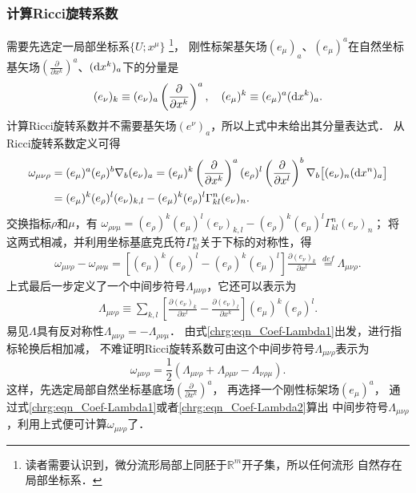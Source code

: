 \subsubsection{计算Ricci旋转系数}
     需要先选定一局部坐标系$\{U;x^\mu\}$
    {\footnote{读者需要认识到，微分流形局部上同胚于$\mathbb{R}^m$开子集，所以任何流形
            自然存在局部坐标系．}}，
刚性标架基矢场$(e_\mu)_{a}$、$(e_\mu)^{a}$在自然坐标
基矢场$(\frac{\partial}{\partial x^k})^{a}$、$({\rm d}x^k)_{a}$下的分量是
\begin{equation}\label{chrg:eqn_component-base}
(e_\nu)_{k} \equiv (e_\nu)_{a} \left(\frac{\partial}{\partial x^k}\right)^{a} , \quad
(e_\mu)^{k} \equiv (e_\mu)^{a} ({\rm d}x^k)_{a}.
\end{equation}
计算Ricci旋转系数并不需要基矢场$(e^\nu)_{a}$，所以上式中未给出其分量表达式．
从Ricci旋转系数定义可得
\begin{align*}
  \omega_{\mu\nu\rho} &= (e_\mu)^a  (e_\rho)^b \nabla _b (e_\nu)_a
  = (e_\mu)^{k} \left(\frac{\partial}{\partial x^k}\right)^{a}
   (e_\rho)^{l} \left(\frac{\partial}{\partial x^l}\right)^{b}
    \nabla _b \bigl[ (e_\nu)_{n}({\rm d}x^n)_{a} \bigr]  \\
  &=(e_\mu)^{k}(e_\rho)^{l} (e_\nu)_{k,l}
   -(e_\mu)^{k}(e_\rho)^{l}\Gamma^n _{kl}(e_\nu)_{n} .
\end{align*}
交换指标$\rho$和$\mu$，有
$ \omega_{\rho\nu\mu} =(e_\rho)^{k}(e_\mu)^{l} (e_\nu)_{k,l}
-(e_\rho)^{k}(e_\mu)^{l}\Gamma^n _{kl}(e_\nu)_{n}$；
将这两式相减，并利用坐标基底克氏符$\Gamma^n _{kl}$关于下标的对称性，得
\begin{align}
  \omega_{\mu\nu\rho}  -  \omega_{\rho\nu\mu}=
  \left[ (e_\mu)^{k}(e_\rho)^{l}
     - (e_\rho)^{k}(e_\mu)^{l}  \right]
     \frac{\partial (e_\nu)_{k}}{\partial x^l}
  \ \overset{def}{=} \Lambda_{\mu\nu\rho}. \label{chrg:eqn_Coef-Lambda1}
\end{align}
上式最后一步定义了一个中间步符号$\Lambda_{\mu\nu\rho}$，它还可以表示为
\begin{align}
    \Lambda_{\mu\nu\rho} \equiv \sum_{k,l }
    \left[ \frac{\partial (e_\nu)_{k}}{\partial x^l} -\frac{\partial (e_\nu)_{l}}{\partial x^k} \right]
    (e_\mu)^{k} (e_\rho)^{l} .  \label{chrg:eqn_Coef-Lambda2}
\end{align}
易见$\Lambda$具有反对称性$\Lambda_{\mu\nu\rho}=-\Lambda_{\rho\nu\mu}$．
由式\eqref{chrg:eqn_Coef-Lambda1}出发，进行指标轮换后相加减，
不难证明Ricci旋转系数可由这个中间步符号$\Lambda_{\mu\nu\rho}$表示为
\begin{equation}\label{chrg:eqn_Ricci-Coef}
\omega_{\mu\nu\rho} = \frac{1}{2}\left(\Lambda_{\mu\nu\rho}
+ \Lambda_{\rho\mu\nu} - \Lambda_{\nu\rho\mu} \right) .
\end{equation}
这样，先选定局部自然坐标基底场$(\frac{\partial}{\partial x^k})^{a}$，
再选择一个刚性标架场$(e_\mu)^a$，
通过式\eqref{chrg:eqn_Coef-Lambda1}或者\eqref{chrg:eqn_Coef-Lambda2}算出
中间步符号$\Lambda_{\mu\nu\rho}$，利用上式便可计算$\omega_{\mu\nu\rho}$了．

